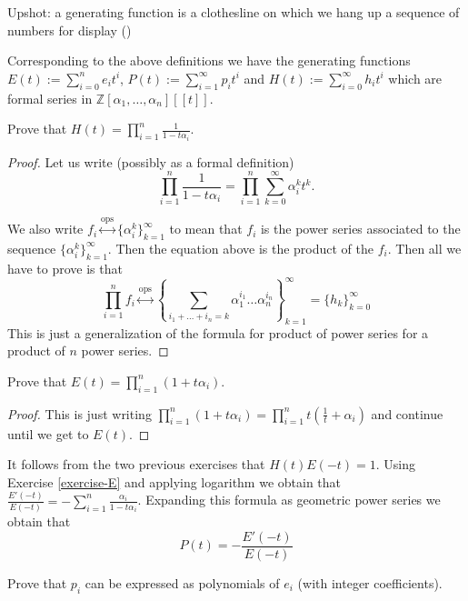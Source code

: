 \noindent
Upshot: a generating function is a
clothesline on which we hang up a sequence of
numbers
for display
(\cite[p. 1]{generatingfunctionology})

\noindent
Corresponding to the above definitions we
have the generating functions
$E(t):=\sum_{i=0}^ne_it^i$,
$P(t):=\sum_{i=1}^\infty p_it^i$ and
$H(t):=\sum_{i=0}^\infty h_it^i$ which are
formal series in
$\mathbb{Z}[\alpha_1,\ldots,\alpha_n][\![t]
\!]$.

\begin{exercise}
\label{exercise-H}
Prove that
$H(t)=\prod_{i=1}^n\frac{1}{1-t\alpha_i}$.
\end{exercise}

\begin{proof}
Let us write (possibly as a formal
definition)
$$
\prod_{i=1}^n\frac{1}{1-t\alpha_i}=\prod_{i=
1}^n\sum_{k=0}^\infty\alpha_i^kt^k.
$$

We also write
$f_i\overset{\text{ops}}{\longleftrightarrow}
\{\alpha_i^k\}_{k=1}^\infty$
to mean
that $f_i$ is the power series associated to
the sequence
$\{\alpha_i^k\}_{k=1}^\infty$. Then the
equation above is the product of the
$f_i$. Then all we have to prove is that
$$
\prod_{i=1}^nf_i\overset{\text{ops}}
{\longleftrightarrow}
\left\{\sum_{i_1+\ldots+i_n=k}\alpha_1^{i_1}
\ldots\alpha_n^{i_n}\right\}
_{k=1}^\infty=\{h_k\}_{k=0}^\infty
$$
This is just a generalization of the formula
for product of power series for a
product of $n$ power series.
\end{proof}

\begin{exercise}
\label{exercise-E}
Prove that $E(t)=\prod_{i=1}^n(1+t\alpha_i)$.
\end{exercise}

\begin{proof}
This is just writing
$\prod_{i=1}^n(1+t\alpha_i)
=\prod_{i=1}^nt(\frac{1}{t}+\alpha_i)$ and
continue until we get to $E(t)$.
\end{proof}

\noindent
It follows from the two previous exercises
that $H(t)E(-t)=1$. Using Exercise
\ref{exercise-E} and applying logarithm we
obtain that
$\frac{E'(-t)}{E(-t)}=-\sum_{i=1}^n
\frac{\alpha_i}{1-t\alpha_i}$. Expanding
this formula as geometric power series we
obtain that
\begin{equation}
\label{equation-P-in-terms-of-E}
P(t)=-\frac{E'(-t)}{E(-t)}
\end{equation}

\begin{exercise}
\label{exercise-p-polynomials-of-e}
Prove that $p_i$ can be expressed as
polynomials of $e_i$ (with integer
coefficients).
\end{exercise}

